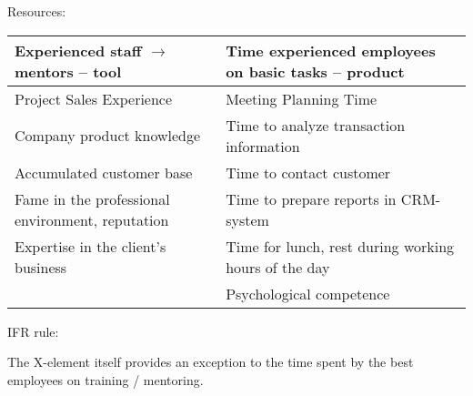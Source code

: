 \documentclass[11pt,a4paper]{book}
\begin{document}
Resources:

\begin{center}
  \begin{tabular}{|p{}|p{}|}\hline 
    Experienced staff $\to$ mentors -- tool & Time experienced employees on
    basic tasks -- product\\\hline
    Project Sales Experience & Meeting Planning Time\\\hline
    Company product knowledge & Time to analyze transaction
    information\\\hline
    Accumulated customer base & Time to contact customer\\\hline
    Fame in the professional environment, reputation & Time to prepare reports
    in CRM-system\\\hline
    Expertise in the client’s business& Time for lunch, rest during working
    hours of the day\\\hline
    & Psychological competence\\\hline
  \end{tabular}
\end{center}

IFR rule:

The X-element itself provides an exception to the time spent by the best
employees on training / mentoring.
\end{document}
